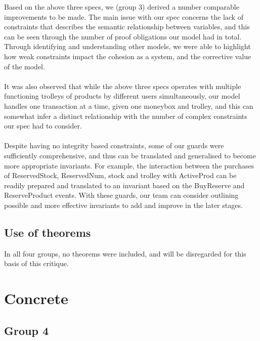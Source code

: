 Based on the above three specs, we (group 3) derived a number comparable improvements to be made. The main issue with our spec concerns the lack of constraints that describes the semantic relationship between variables, and this can be seen through the number of proof obligations our model had in total. Through identifying and understanding other models, we were able to highlight how weak constraints impact the cohesion as a system, and the corrective value of the model.
 \\ \\ It was also observed that while the above three specs operates with multiple functioning trolleys of products by different users simultaneously, our model handles one transaction at a time, given one moneybox and trolley, and this can somewhat infer a distinct relationship with the number of complex constraints our spec had to consider.
 \\ \\ Despite having no integrity based constraints, some of our guards were sufficiently comprehensive, and thus can be translated and generalised to become more appropriate invariants. For example, the interaction between the purchases of ReservedStock, ReservedNum, stock and trolley with ActiveProd can be readily prepared and translated to an invariant based on the BuyReserve and ReserveProduct events. With these guards, our team can consider outlining possible and more effective invariants to add and improve in the later stages.

\subsection{Use of theorems}
\label{useoftheorems}

In all four groups, no theorems were included, and will be disregarded for this basis of this critique.

\section{Concrete}
\label{concrete}

\subsection{Group 4}
\label{group4}

